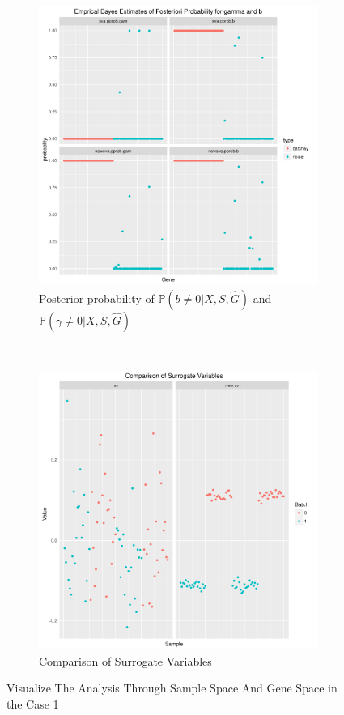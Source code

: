 \documentclass[11pt]{article}
\begin{document}
\begin{figure}[h!]
    \centering
    \begin{subfigure}[t]{0.46\textwidth}
    \centering
    \includegraphics[width = \textwidth]{figures/pprop4.pdf}
    \caption{Posterior probability of $\mathbb{P}(b \neq 0 | X, S, \hat{G})$ and $\mathbb{P}(\gamma \neq 0 | X, S, \hat{G})$}
    \end{subfigure}
~    
    \begin{subfigure}[t]{0.46\textwidth}
    \centering
    \includegraphics[width = \textwidth]{figures/vector4.pdf}
    \caption{Comparison of Surrogate Variables}
    \end{subfigure}
    \caption{Visualize The Analysis Through Sample Space And Gene Space in the Case 1}
\end{figure}
\end{document}
